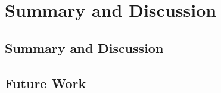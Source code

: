 \chapter{Summary and Discussion}\label{ch:summary_and_discussion}

\section{Summary and Discussion}

\section{Future Work}


